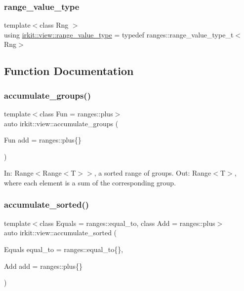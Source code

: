 \subsubsection{\texorpdfstring{range\+\_\+value\+\_\+type}{range\_value\_type}}
{\footnotesize\ttfamily template$<$class Rng $>$ \\
using \hyperlink{namespaceirkit_1_1view_aa01f8ad24d5b6600bc31631b56448817}{irkit\+::view\+::range\+\_\+value\+\_\+type} = typedef ranges\+::range\+\_\+value\+\_\+type\+\_\+t$<$Rng$>$}



\subsection{Function Documentation}
\mbox{\label{namespaceirkit_1_1view_a2833f7d6ed97305f13072bd8de6faedf}} 
\subsubsection{\texorpdfstring{accumulate\+\_\+groups()}{accumulate\_groups()}}
{\footnotesize\ttfamily template$<$class Fun  = ranges\+::plus$>$ \\
auto irkit\+::view\+::accumulate\+\_\+groups (\begin{DoxyParamCaption}\item[{Fun}]{add = {\ttfamily ranges\+:\+:plus\{\}} }\end{DoxyParamCaption})}

In\+: Range$<$Range$<$\+T$>$$>$, a sorted range of groups. Out\+: Range$<$\+T$>$, where each element is a sum of the corresponding group. \mbox{\label{namespaceirkit_1_1view_a11c6ca66beb07c9749c099501322bda9}} 
\subsubsection{\texorpdfstring{accumulate\+\_\+sorted()}{accumulate\_sorted()}}
{\footnotesize\ttfamily template$<$class Equals  = ranges\+::equal\+\_\+to, class Add  = ranges\+::plus$>$ \\
auto irkit\+::view\+::accumulate\+\_\+sorted (\begin{DoxyParamCaption}\item[{Equals}]{equal\+\_\+to = {\ttfamily ranges\+:\+:equal\+\_\+to\{\}},  }\item[{Add}]{add = {\ttfamily ranges\+:\+:plus\{\}} }\end{DoxyParamCaption})}

